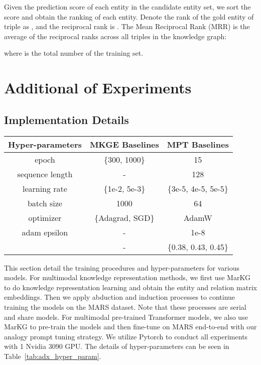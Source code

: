 \documentclass{article} \usepackage{iclr2023_conference,times}
\newcommand{\data}{MARS}
\newcommand{\kg}{MarKG}
\begin{document}
Given the prediction score of each entity in the candidate entity set, we sort the score and obtain the ranking of each entity. Denote the rank of the gold entity of  triple as , and the reciprocal rank is . The Mean Reciprocal Rank (MRR) is the average of the reciprocal ranks across all triples in the knowledge graph:

where  is the total number of the training set.


\section{Additional of Experiments}
\label{adx:experiment}

\subsection{Implementation Details}

\begin{table*}[!htbp]
\small
    \centering
    \begin{tabular}{ccc}
\toprule
      Hyper-parameters & MKGE Baselines  & MPT Baselines \\
\midrule
    epoch & \{300, 1000\} & 15 \\
   sequence length & - &  128 \\
   learning rate & \{1e-2, 5e-3\} & \{3e-5, 4e-5, 5e-5\} \\
   batch size & 1000 & 64 \\
   optimizer & \{Adagrad, SGD\} & AdamW \\
   adam epsilon & - & 1e-8 \\
    & - & \{0.38, 0.43, 0.45\} \\
\bottomrule
    \end{tabular}
\caption{Hyper-parameter settings. We use the same parameter settings of MKGE baseline methods as the original paper except for the learning rate. }
\label{tab:adx_hyper_param}
\end{table*}

This section detail the training procedures and hyper-parameters for various models.
For multimodal knowledge representation methods, we first use {\kg} to do knowledge representation learning and obtain the entity and relation matrix embeddings.
Then we apply abduction and induction processes to continue training the models on the {\data} dataset. Note that these processes are serial and share models.  
For multimodal pre-trained Transformer models, we also use {\kg} to pre-train the models and then fine-tune on {\data} end-to-end with our analogy prompt tuning strategy. 
We utilize Pytorch to conduct all experiments with 1 Nvidia 3090 GPU. 
The details of hyper-parameters can be seen in Table~\ref{tab:adx_hyper_param}.
\end{document}
